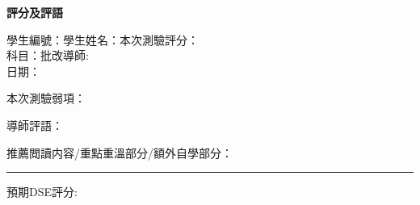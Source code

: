 \documentclass{article}
\begin{document}
    \begin{center}
        \textbf{評分及評語}
    \end{center}

    \noindent 學生編號：\hrulefill 學生姓名：\hrulefill \hfill 本次測驗評分：\hrulefill\\
    科目：\hrulefill\hfill 批改導師:\hrulefill\\
    日期：

    \noindent 本次測驗弱項：
    \vspace{5cm}

    \noindent 導師評語：

    \hrulefill

    \hrulefill

    \hrulefill

    \hrulefill

    \hrulefill

    \hrulefill

    \hrulefill

    \noindent 推薦閲讀内容/重點重溫部分/額外自學部分：
    \vspace{5cm}
    
    \hrule

    \noindent 預期DSE評分:
\end{document}
